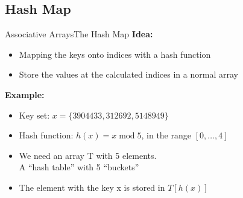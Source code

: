 \subsection{Hash Map}

\begin{frame}{Associative Arrays}{The Hash Map}
  \textbf{Idea:}
  \begin{itemize}
    \item
      Mapping the keys onto indices with a {\color{MainA}hash function}
    \item
      Store the values at the calculated indices in a normal array
  \end{itemize}
  \textbf{Example:}
  \begin{itemize}
    \item
      Key set: $x = \{3904433, 312692, 5148949\}$
     \item
      Hash function:
      {\color{MainA}$h(x) = x \;\mathrm{mod}\; 5$},
      in the range {\color{MainA} $[0, \ldots, 4]$ }
     \item We need an array {\color{MainA}T}
      with {\color{MainA}5} elements.\\
      A \enquote{hash table} with 5 \enquote{buckets}
     \item
      The element with the key {\color{MainA}x}
      is stored in {\color{MainA}$T[h(x)]$}
  \end{itemize}
\end{frame}


